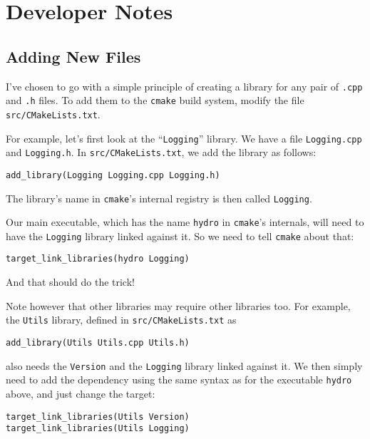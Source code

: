 \newpage
\section{Developer Notes}


\subsection{Adding New Files}

I've chosen to go with a simple principle of creating a library for any pair of
\verb|.cpp| and \verb|.h| files. To add them to the \verb|cmake| build system,
modify the file \verb|src/CMakeLists.txt|.


For example, let's first look at the ``\verb|Logging|'' library. We have a file
\verb|Logging.cpp| and \verb|Logging.h|. In \verb|src/CMakeLists.txt|, we add
the library as follows:

\begin{lstlisting}
add_library(Logging Logging.cpp Logging.h)
\end{lstlisting}

The library's name in \verb|cmake|'s internal registry is then called
\verb|Logging|.

Our main executable, which has the name \verb|hydro| in \verb|cmake|'s
internals, will need to have the \verb|Logging| library linked against it. So
we need to tell \verb|cmake| about that:

\begin{lstlisting}
target_link_libraries(hydro Logging)
\end{lstlisting}

And that should do the trick!


Note however that other libraries may require other libraries too. For example,
the \verb|Utils| library, defined in \verb|src/CMakeLists.txt| as

\begin{lstlisting}
add_library(Utils Utils.cpp Utils.h)
\end{lstlisting}

also needs the \verb|Version| and the \verb|Logging| library linked against it.
We then simply need to add the dependency using the same syntax as for the
executable \verb|hydro| above, and just change the target:

\begin{lstlisting}
target_link_libraries(Utils Version)
target_link_libraries(Utils Logging)
\end{lstlisting}





